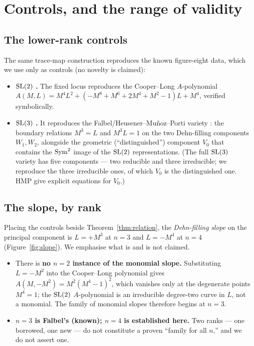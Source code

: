 \section{Controls, and the range of validity}
\label{sec:controls}

\subsection{The lower-rank controls} The same trace-map construction reproduces the known figure-eight
data, which we use only as controls (no novelty is claimed):
\begin{itemize}[leftmargin=1.4em]
\item \textbf{$\mathrm{SL}(2)$ \sKnown.} The fixed locus reproduces the Cooper--Long $A$-polynomial
  \cite{ccgls1994}
  $A(M,L)=M^4L^2+(-M^8+M^6+2M^4+M^2-1)L+M^4$, verified symbolically.
\item \textbf{$\mathrm{SL}(3)$ \sKnown.} It reproduces the Falbel/Heusener--Mu\~noz--Porti variety
  \cite{fgkrt2014,hmp2016}: the boundary relations $M^3=L$ and $M^3L=1$ on the two Dehn-filling components
  $W_1,W_2$, alongside the geometric (``distinguished'') component $V_0$ that contains the $\operatorname{Sym}^2$ image
  of the $\mathrm{SL}(2)$ representations. (The full $\mathrm{SL}(3)$ variety has five components --- two reducible and
  three irreducible; we reproduce the three irreducible ones, of which $V_0$ is the distinguished one.
  HMP give explicit equations for $V_0$.)
\end{itemize}

\subsection{The slope, by rank} Placing the controls beside Theorem~\ref{thm:relation}, the
\emph{Dehn-filling slope} on the principal component is $L=+M^3$ at $n=3$ and $L=-M^4$ at $n=4$
(Figure~\ref{fig:slope}). We emphasise what is and is not claimed.

\begin{itemize}[leftmargin=1.4em]
\item There is \textbf{no $n=2$ instance of the monomial slope.} Substituting $L=-M^2$ into the
  Cooper--Long polynomial gives $A(M,-M^2)=M^2(M^4-1)^2$, which vanishes only at the degenerate points
  $M^4=1$; the $\mathrm{SL}(2)$ $A$-polynomial is an irreducible degree-two curve in $L$, not a monomial. The
  family of monomial slopes therefore begins at $n=3$.
\item \textbf{$n=3$ is Falbel's (known); $n=4$ is established here.} Two ranks --- one borrowed, one new
  --- do not constitute a proven ``family for all $n$,'' and we do not assert one.
\end{itemize}

